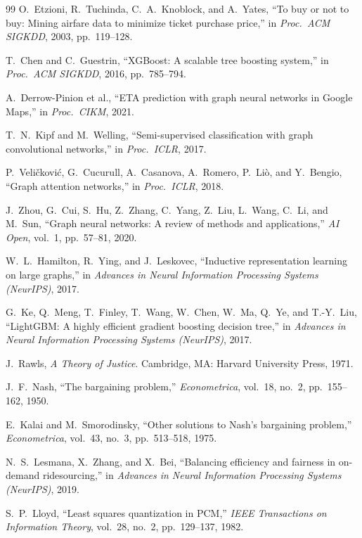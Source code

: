 \documentclass[review]{elsarticle}
\begin{document}
\begin{thebibliography}{99}
O.\ Etzioni, R.\ Tuchinda, C.\ A.\ Knoblock, and A.\ Yates, ``To buy or not to buy: Mining airfare data to minimize ticket purchase price,'' in \textit{Proc.\ ACM SIGKDD}, 2003, pp.~119--128.

T.\ Chen and C.\ Guestrin, ``XGBoost: A scalable tree boosting system,'' in \textit{Proc.\ ACM SIGKDD}, 2016, pp.~785--794.

A.\ Derrow-Pinion et al., ``ETA prediction with graph neural networks in Google Maps,'' in \textit{Proc.\ CIKM}, 2021.

T.\ N.\ Kipf and M.\ Welling, ``Semi-supervised classification with graph convolutional networks,'' in \textit{Proc.\ ICLR}, 2017.

P.\ Veli\v{c}kovi\'{c}, G.\ Cucurull, A.\ Casanova, A.\ Romero, P.\ Li\`{o}, and Y.\ Bengio, ``Graph attention networks,'' in \textit{Proc.\ ICLR}, 2018.

J.\ Zhou, G.\ Cui, S.\ Hu, Z.\ Zhang, C.\ Yang, Z.\ Liu, L.\ Wang, C.\ Li, and M.\ Sun, ``Graph neural networks: A review of methods and applications,'' \textit{AI Open}, vol.~1, pp.~57--81, 2020.

W.\ L.\ Hamilton, R.\ Ying, and J.\ Leskovec, ``Inductive representation learning on large graphs,'' in \textit{Advances in Neural Information Processing Systems (NeurIPS)}, 2017.

G.\ Ke, Q.\ Meng, T.\ Finley, T.\ Wang, W.\ Chen, W.\ Ma, Q.\ Ye, and T.-Y.\ Liu, ``LightGBM: A highly efficient gradient boosting decision tree,'' in \textit{Advances in Neural Information Processing Systems (NeurIPS)}, 2017.

J.\ Rawls, \textit{A Theory of Justice}. Cambridge, MA: Harvard University Press, 1971.

J.\ F.\ Nash, ``The bargaining problem,'' \textit{Econometrica}, vol.~18, no.~2, pp.~155--162, 1950.

E.\ Kalai and M.\ Smorodinsky, ``Other solutions to Nash's bargaining problem,'' \textit{Econometrica}, vol.~43, no.~3, pp.~513--518, 1975.

N.\ S.\ Lesmana, X.\ Zhang, and X.\ Bei, ``Balancing efficiency and fairness in on-demand ridesourcing,'' in \textit{Advances in Neural Information Processing Systems (NeurIPS)}, 2019.

S.\ P.\ Lloyd, ``Least squares quantization in PCM,'' \textit{IEEE Transactions on Information Theory}, vol.~28, no.~2, pp.~129--137, 1982.


\end{thebibliography}
\end{document}
